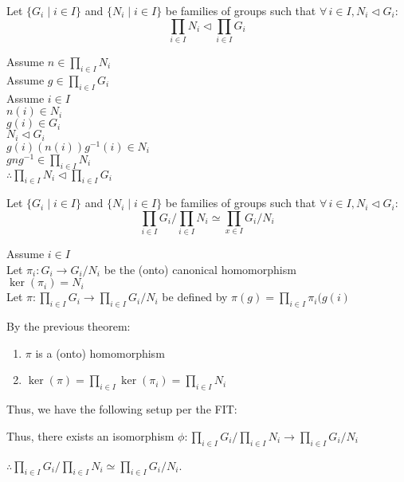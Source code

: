 \documentclass[letterpaper,12pt,fleqn]{article}
\newcommand{\xprod}[1]{\prod_{i\in I}#1_i}
\renewcommand{\fam}[1]{\{#1_i\mid i\in I\}}
\newcommand{\n}{\triangleleft}
\begin{document}
\begin{theorem}
  Let $\fam{G}$ and $\fam{N}$ be families of groups such that
  $\forall\,i\in I,N_i\n G_i$:
  \[\xprod{N}\n\xprod{G}\]
\end{theorem}

\begin{theproof}
  Assume $n\in\xprod{N}$ \\
  Assume $g\in\xprod{G}$ \\
  Assume $i\in I$ \\
  $n(i)\in N_i$ \\
  $g(i)\in G_i$ \\
  $N_i\n G_i$ \\
  $g(i)(n(i))g^{-1}(i)\in N_i$ \\
  $gng^{-1}\in\xprod{N}$ \\
  $\therefore\xprod{N}\n\xprod{G}$
\end{theproof}
\newpage
\begin{theorem}
  Let $\fam{G}$ and $\fam{N}$ be families of groups such that
  $\forall\,i\in I,N_i\n G_i$:
  \[\xprod{G}/\xprod{N}\simeq\prod_{x\in I}G_i/N_i\]
\end{theorem}

\begin{theproof}
  Assume $i\in I$ \\
  Let $\pi_i:G_i\to G_i/N_i$ be the (onto) canonical homomorphism \\
  $\ker(\pi_i)=N_i$ \\
  Let $\pi:\xprod{G}\to\prod_{i\in I}G_i/N_i$ be defined by
  $\pi(g)=\prod_{i\in I}\pi_i(g(i)$
  
  By the previous theorem:
  \begin{enumerate}
  \item $\pi$ is a (onto) homomorphism
  \item $\ker(\pi)=\prod_{i\in I}\ker(\pi_i)=\xprod{N}$
  \end{enumerate}

  Thus, we have the following setup per the FIT:

  \bigskip


  \bigskip

  Thus, there exists an isomorphism
  $\phi:\xprod{G}/\xprod{N}\to\prod_{i\in I}G_i/N_i$

  $\therefore\xprod{G}/\xprod{N}\simeq\prod_{i\in I}G_i/N_i$.
\end{theproof}
\end{document}
